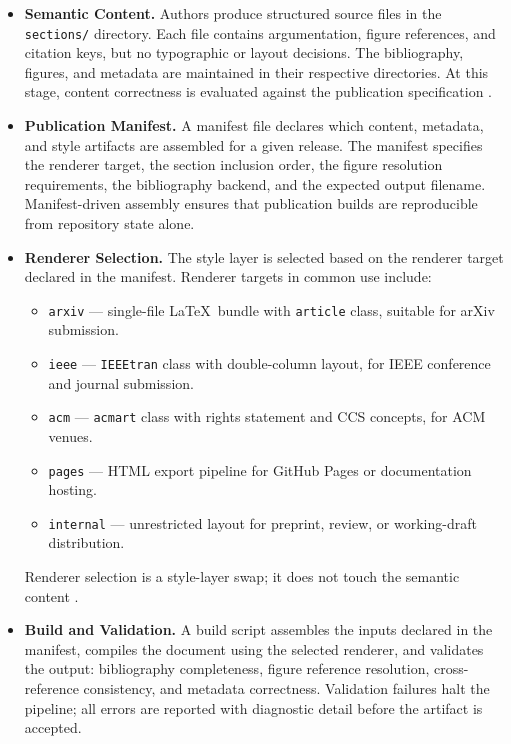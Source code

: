 \begin{itemize}
  \item \textbf{Semantic Content.} Authors produce structured source files in the \texttt{sections/} directory. Each file contains argumentation, figure references, and citation keys, but no typographic or layout decisions. The bibliography, figures, and metadata are maintained in their respective directories. At this stage, content correctness is evaluated against the publication specification \cite{Parnas1972Modularization}.

  \item \textbf{Publication Manifest.} A manifest file declares which content, metadata, and style artifacts are assembled for a given release. The manifest specifies the renderer target, the section inclusion order, the figure resolution requirements, the bibliography backend, and the expected output filename. Manifest-driven assembly ensures that publication builds are reproducible from repository state alone.

  \item \textbf{Renderer Selection.} The style layer is selected based on the renderer target declared in the manifest. Renderer targets in common use include:
  \begin{itemize}
    \item \texttt{arxiv} --- single-file \LaTeX\ bundle with \texttt{article} class, suitable for arXiv submission.
    \item \texttt{ieee} --- \texttt{IEEEtran} class with double-column layout, for IEEE conference and journal submission.
    \item \texttt{acm} --- \texttt{acmart} class with rights statement and CCS concepts, for ACM venues.
    \item \texttt{pages} --- HTML export pipeline for GitHub Pages or documentation hosting.
    \item \texttt{internal} --- unrestricted layout for preprint, review, or working-draft distribution.
  \end{itemize}
  Renderer selection is a style-layer swap; it does not touch the semantic content \cite{Vogels2009EventuallyConsistent}.

  \item \textbf{Build and Validation.} A build script assembles the inputs declared in the manifest, compiles the document using the selected renderer, and validates the output: bibliography completeness, figure reference resolution, cross-reference consistency, and metadata correctness. Validation failures halt the pipeline; all errors are reported with diagnostic detail before the artifact is accepted.


\end{itemize}
